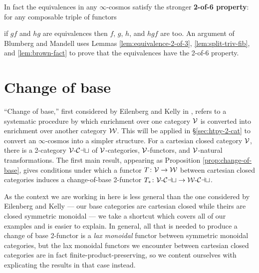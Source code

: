 \begin{rmk}\label{rmk:2-of-6}
In fact the equivalences in any $\infty$-cosmos satisfy the stronger \textbf{2-of-6 property}: for any composable triple of functors
\begin{center}
\end{center}
if $gf$ and $hg$ are equivalences then $f$, $g$, $h$, and $hgf$ are too. An argument of Blumberg and Mandell \cite[6.4]{BlumbergMandell:2011ak} uses Lemmas \ref{lem:equivalence-2-of-3}, \ref{lem:split-triv-fib}, and \ref{lem:brown-fact} to prove that the equivalences have the 2-of-6 property.
\end{rmk}



\section{Change of base}\label{sec:change-of-base}

``Change of base,'' first considered by Eilenberg and Kelly in \cite{EilenbergKelly:1966cc}, refers to a systematic procedure by which enrichment over one category ${\mathord{\mathcal{V}}}$ is converted into enrichment over another category ${\mathord{\mathcal{W}}}$.  This will be applied in \S\ref{sec:htpy-2-cat} to convert an $\infty$-cosmos into a simpler structure.
For a cartesian closed category ${\mathord{\mathcal{V}}}$, there is a 2-category ${{\mathord{\mathcal{V}}}}\text{-}{\mathord{\mathcal{Cat}}}$ of ${\mathord{\mathcal{V}}}$-categories, ${\mathord{\mathcal{V}}}$-functors, and ${\mathord{\mathcal{V}}}$-natural transformations. The first main result, appearing as Proposition \ref{prop:change-of-base}, gives conditions under which a functor $T \colon {\mathord{\mathcal{V}}} \to {\mathord{\mathcal{W}}}$ between cartesian closed categories induces a change-of-base 2-functor $T_* \colon {{\mathord{\mathcal{V}}}}\text{-}{\mathord{\mathcal{Cat}}} \to {{\mathord{\mathcal{W}}}}\text{-}{\mathord{\mathcal{Cat}}}$.

As the context we are working in here is less general than the one considered by Eilenberg and Kelly --- our base categories are cartesian closed while theirs are closed symmetric monoidal --- we take a shortcut which covers all of our examples and is easier to explain.  In general, all that is needed to produce a change of base 2-functor is a \emph{lax monoidal} functor between symmetric monoidal categories, but the lax monoidal functors we encounter between cartesian closed categories are in fact finite-product-preserving, so we content ourselves with explicating the results in that case instead.

